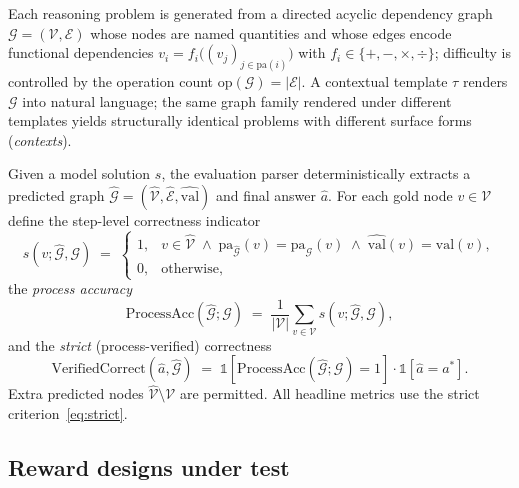 \documentclass[11pt]{article}
\newcommand{\ind}[1]{\ensuremath{\mathbb{1}\!\left[#1\right]}}
\begin{document}
Each reasoning problem is generated from a directed acyclic dependency graph
$\mathcal{G} = (\mathcal{V}, \mathcal{E})$ whose nodes are named quantities and whose
edges encode functional dependencies $v_i = f_i\big((v_j)_{j \in \mathrm{pa}(i)}\big)$
with $f_i \in \{+,-,\times,\div\}$; difficulty is controlled by the operation count
$\mathrm{op}(\mathcal{G}) = |\mathcal{E}|$. A contextual template $\tau$ renders
$\mathcal{G}$ into natural language; the same graph family rendered under different
templates yields structurally identical problems with different surface forms
(\emph{contexts}).

Given a model solution $s$, the evaluation parser deterministically extracts a predicted
graph $\hat{\mathcal{G}} = (\hat{\mathcal{V}}, \hat{\mathcal{E}}, \widehat{\mathrm{val}})$
and final answer $\hat a$. For each gold node $v \in \mathcal{V}$ define the step-level
correctness indicator
\begin{equation}
s(v;\hat{\mathcal{G}},\mathcal{G}) \;=\;
\begin{cases}
1, & v \in \hat{\mathcal{V}} \;\wedge\; \mathrm{pa}_{\hat{\mathcal{G}}}(v) = \mathrm{pa}_{\mathcal{G}}(v)
     \;\wedge\; \widehat{\mathrm{val}}(v) = \mathrm{val}(v),\\[2pt]
0, & \text{otherwise},
\end{cases}
\label{eq:step}
\end{equation}
the \emph{process accuracy}
\begin{equation}
\mathrm{ProcessAcc}(\hat{\mathcal{G}};\mathcal{G}) \;=\; \frac{1}{|\mathcal{V}|}
\sum_{v \in \mathcal{V}} s(v;\hat{\mathcal{G}},\mathcal{G}),
\label{eq:procacc}
\end{equation}
and the \emph{strict} (process-verified) correctness
\begin{equation}
\mathrm{VerifiedCorrect}(\hat a, \hat{\mathcal{G}}) \;=\;
\ind{\mathrm{ProcessAcc}(\hat{\mathcal{G}};\mathcal{G}) = 1} \cdot \ind{\hat a = a^{*}}.
\label{eq:strict}
\end{equation}
Extra predicted nodes $\hat{\mathcal{V}} \setminus \mathcal{V}$ are permitted. All
headline metrics use the strict criterion~\eqref{eq:strict}.

\subsection{Reward designs under test}
\end{document}
